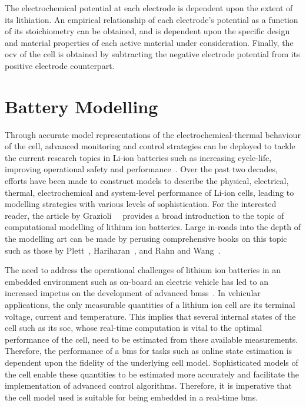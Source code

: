 The electrochemical potential at each electrode  is dependent upon the extent of
its  lithiation. An  empirical  relationship of  each  electrode's potential  as
a  function  of  its  stoichiometry  can be  obtained,  and  is  dependent  upon
the  specific design  and  material  properties of  each  active material  under
consideration. Finally, the \gls{ocv} of the cell is obtained by subtracting the
negative electrode potential from its positive electrode counterpart.


\section{Battery Modelling}

Through accurate model representations  of the electrochemical-thermal behaviour
of  the cell,  advanced monitoring  and control  strategies can  be deployed  to
tackle  the current  research  topics  in Li-ion  batteries  such as  increasing
cycle-life,  improving  operational   safety  and  performance~\cite{Plett2015}.
Over  the past  two  decades, efforts  have  been made  to  construct models  to
describe  the physical,  electrical, thermal,  electrochemical and  system-level
performance  of  Li-ion cells,  leading  to  modelling strategies  with  various
levels  of   sophistication.  For   the  interested   reader,  the   article  by
Grazioli~\etal~\cite{Grazioli2016a} provides  a broad introduction to  the topic
of computational  modelling of  lithium ion batteries.  Large in-roads  into the
depth of the modelling  art can be made by perusing  comprehensive books on this
topic such  as those by  Plett~\cite{Plett2015}, Hariharan~\cite{Hariharan2017},
and Rahn and Wang~\cite{Rahn2013}.

The  need  to  address  the  operational challenges  of  lithium  ion  batteries
in   an   embedded   environment   such  as   on-board   an   electric   vehicle
has   led   to  an   increased   impetus   on   the  development   of   advanced
\glspl{bms}~\cite{Bergveld2002}. In vehicular  applications, the only measurable
quantities  of  a  lithium  ion  cell are  its  terminal  voltage,  current  and
temperature. This implies  that several internal states of the  cell such as its
\gls{soc}, whose  real-time computation is  vital to the optimal  performance of
the cell, need to be estimated from these available measurements. Therefore, the
performance  of  a \gls{bms}  for  tasks  such  as  online state  estimation  is
dependent upon the  fidelity of the underlying cell  model. Sophisticated models
of  the  cell enable  these  quantities  to  be  estimated more  accurately  and
facilitate the implementation  of advanced control algorithms.  Therefore, it is
imperative  that  the cell  model  used  is suitable  for  being  embedded in  a
real-time \gls{bms}.

